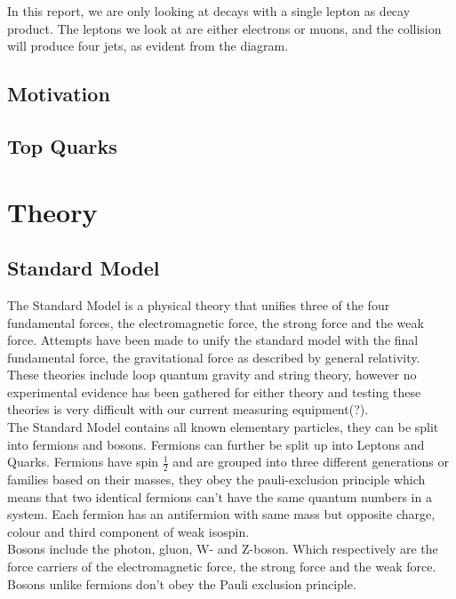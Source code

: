 \documentclass[11pt,a4paper]{article}
\begin{document}
In this report, we are only looking at decays with a single lepton as decay product. The leptons we look at are either electrons or muons, and the collision will produce four jets, as evident from the diagram.


\subsection{Motivation}

\subsection{Top Quarks}

\section{Theory}

\subsection{Standard Model}
The Standard Model is a physical theory that unifies
three of the four fundamental forces, the electromagnetic force, the strong
force and the weak force. Attempts have been made to unify the standard model
with the final fundamental force, the gravitational force as described by
general relativity. These theories include loop quantum gravity and string
theory, however no experimental evidence has been gathered for either theory and
testing these theories is very difficult with our current measuring
equipment(?).\\

The Standard Model contains all known elementary particles, they can be split
into fermions and bosons. Fermions can further be split up into Leptons and
Quarks. Fermions have spin $\frac{1}{2}$ and are grouped into three different
generations or families based on their masses, they obey the pauli-exclusion
principle which means that two identical fermions can't have the same quantum
numbers in a system. Each fermion has an antifermion with same mass but opposite
charge, colour and third component of weak isospin. \\

Bosons include the photon, gluon, W- and Z-boson. Which respectively are the
force carriers of the electromagnetic force, the strong force and the weak
force. Bosons unlike fermions don't obey the Pauli exclusion principle.
\end{document}
